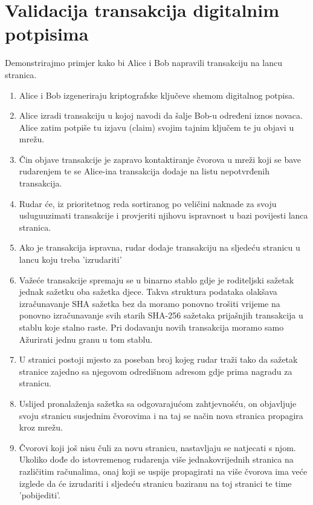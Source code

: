 \documentclass[utf8, zavrsni]{fer}
\begin{document}
\section{Validacija transakcija digitalnim potpisima}
Demonstrirajmo primjer kako bi Alice i Bob napravili transakciju na lancu stranica.
\begin{enumerate}
	\item Alice i Bob izgeneriraju kriptografske ključeve shemom digitalnog potpisa.
	\item Alice izradi transakciju u kojoj navodi da šalje Bob-u određeni iznos novaca. Alice zatim potpiše tu izjavu (claim) svojim tajnim ključem te ju objavi u mrežu.
	\item Čin objave transakcije je zapravo kontaktiranje čvorova u mreži koji se bave rudarenjem te se Alice-ina transakcija dodaje na listu nepotvrđenih transakcija\footnotemark.
	\item Rudar će, iz prioritetnog reda sortiranog po veličini naknade za svoju uslugu\footnotemark uzimati transakcije i provjeriti njihovu ispravnost u bazi povijesti lanca stranica.
	\item Ako je transakcija ispravna, rudar dodaje transakciju na sljedeću stranicu u lancu koju treba 'izrudariti'
	\item Važeće transakcije spremaju se u binarno stablo gdje je roditeljski sažetak jednak sažetku oba sažetka djece. Takva struktura podataka olakšava izračunavanje SHA sažetka bez da moramo ponovno trošiti vrijeme na ponovno izračunavanje svih starih SHA-256 sažetaka prijašnjih transakcija u stablu koje stalno raste. Pri dodavanju novih transakcija moramo samo Ažurirati jednu granu u tom stablu.
	\item U stranici postoji mjesto za poseban broj kojeg rudar traži tako da sažetak stranice zajedno sa njegovom odredišnom adresom gdje prima nagradu za stranicu.\footnotemark
	\item Uslijed pronalaženja sažetka sa odgovarajućom zahtjevnošću, on objavljuje svoju stranicu susjednim čvorovima i na taj se način nova stranica propagira kroz mrežu.
	\item Čvorovi koji još nisu čuli za novu stranicu, nastavljaju se natjecati s njom. Ukoliko dođe do istovremenog rudarenja više jednakovrijednih stranica na različitim računalima, onaj koji se uspije propagirati na više čvorova ima veće izglede da će izrudariti i sljedeću stranicu baziranu na toj stranici te time 'pobijediti'.\footnotemark
\end{enumerate}
\end{document}
